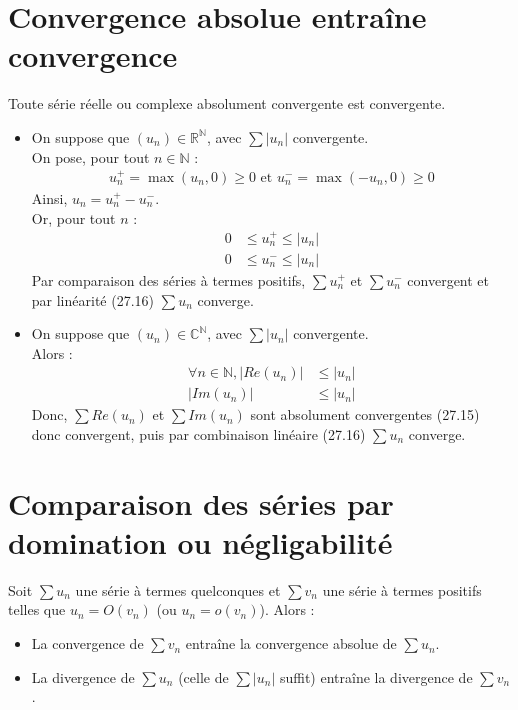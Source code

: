 \documentclass[../main.tex]{subfiles}
\begin{document}
\section{Convergence absolue entraîne convergence}
\begin{tcolorbox}[title=Théorème 27.20, title filled=false, colframe=orange, colback=orange!10!white]
    Toute série réelle ou complexe absolument convergente est convergente. 
\end{tcolorbox}

\begin{itemize}
    \item On suppose que $(u_n)\in \mathbb{R}^{\mathbb{N}}$, avec $\sum |u_n|$ convergente. \\
    On pose, pour tout $n\in \mathbb{N}$ :
    \begin{align*}
        u_n^+ = \max(u_n, 0) \geq 0 \text{ et } u_n^- = \max(-u_n, 0) \geq 0
    \end{align*}
    Ainsi, $u_n = u_n^+ - u_n^-$. \\
    Or, pour tout $n$ : 
    \begin{align*}
        0 &\leq u_n^+ \leq |u_n| \\
        0 &\leq u_n^- \leq |u_n|
    \end{align*}
    Par comparaison des séries à termes positifs, $\sum u_n^+$ et $\sum u_n^-$ convergent et par linéarité (27.16) $\sum u_n$ converge. 

    \item On suppose que $(u_n)\in \mathbb{C}^{\mathbb{N}}$, avec $\sum |u_n|$ convergente. \\
    Alors : 
    \begin{align*}
        \forall n\in \mathbb{N}, |Re(u_n)| &\leq |u_n| \\
        |Im(u_n)| &\leq |u_n|
    \end{align*}
    Donc, $\sum Re(u_n)$ et $\sum Im(u_n)$ sont absolument convergentes (27.15) donc convergent, puis par combinaison linéaire (27.16) $\sum u_n$ converge. 
\end{itemize}

\section{Comparaison des séries par domination ou négligabilité}
\begin{tcolorbox}[title=Théorème 27.23, title filled=false, colframe=orange, colback=orange!10!white]
    Soit $\sum u_n$ une série à termes quelconques et $\sum v_n$ une série à termes positifs telles que $u_n = O(v_n)$ (ou $u_n = o(v_n)$). Alors : 
    \begin{itemize}
        \item La convergence de $\sum v_n$ entraîne la convergence absolue de $\sum u_n$. 
        \item La divergence de $\sum u_n$ (celle de $\sum |u_n|$ suffit) entraîne la divergence de $\sum v_n$.
    \end{itemize}
\end{tcolorbox}
\end{document}
